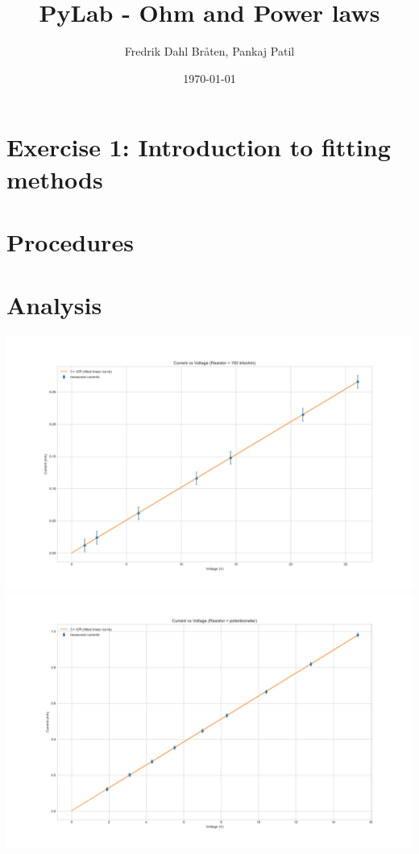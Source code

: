 \documentclass[letterpaper,12pt]{article}
\begin{document}
\title{PyLab - Ohm and Power laws}
\author{Fredrik Dahl Bråten, Pankaj Patil}
\date{\today}
\maketitle

\section*{Exercise 1:  Introduction to fitting methods}

\section{Procedures}

\linebreak
{}

\section{Analysis}

\begin{center}
    \includegraphics[width=1.0\linewidth]{../lab_1_ex_1_plot_100k.png}    
    \includegraphics[width=1.0\linewidth]{../lab_1_ex_1_plot_Potentiometer.png}    
\end{center}
\end{document}
